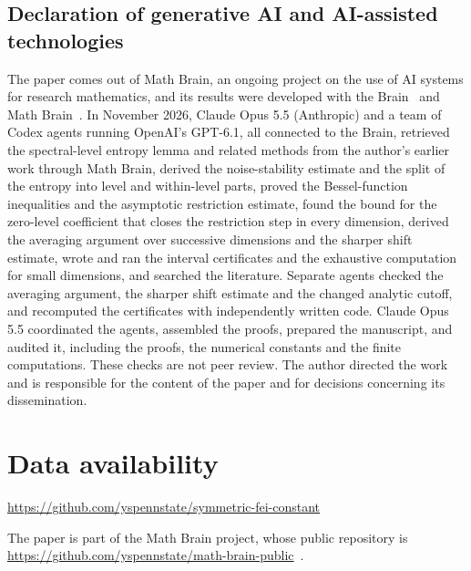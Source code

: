 \documentclass[11pt]{amsart}
\theoremstyle{definition}
\theoremstyle{remark}
\begin{document}
\begin{samepage}
\section*{Declaration of generative AI and AI-assisted technologies}
The paper comes out of Math Brain, an ongoing project on the use of AI systems for research mathematics, and its results were developed with the Brain~\cite{BrainFramework} and Math Brain~\cite{MathBrainRepo}. In November 2026, Claude Opus 5.5 (Anthropic) and a team of Codex agents running OpenAI's GPT-6.1, all connected to the Brain, retrieved the spectral-level entropy lemma and related methods from the author's earlier work through Math Brain, derived the noise-stability estimate and the split of the entropy into level and within-level parts, proved the Bessel-function inequalities and the asymptotic restriction estimate, found the bound for the zero-level coefficient that closes the restriction step in every dimension, derived the averaging argument over successive dimensions and the sharper shift estimate, wrote and ran the interval certificates and the exhaustive computation for small dimensions, and searched the literature. Separate agents checked the averaging argument, the sharper shift estimate and the changed analytic cutoff, and recomputed the certificates with independently written code. Claude Opus 5.5 coordinated the agents, assembled the proofs, prepared the manuscript, and audited it, including the proofs, the numerical constants and the finite computations. These checks are not peer review. The author directed the work and is responsible for the content of the paper and for decisions concerning its dissemination.
\par
\end{samepage}

\section*{Data availability}
\url{https://github.com/yspennstate/symmetric-fei-constant}

The paper is part of the Math Brain project, whose public repository is \url{https://github.com/yspennstate/math-brain-public}~\cite{MathBrainRepo}.
\end{document}
